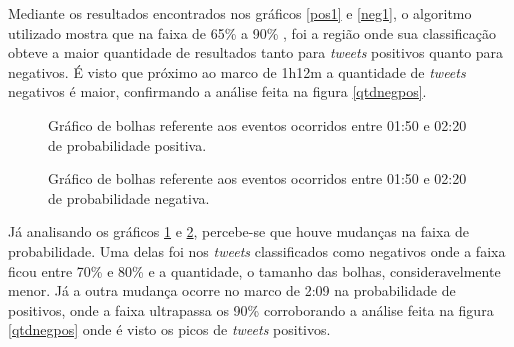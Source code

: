Mediante os resultados encontrados nos gráficos \ref{pos1} e \ref{neg1}, o algoritmo utilizado mostra que na faixa de 65\% a 90\% , foi a região onde sua classificação obteve a maior quantidade de resultados tanto para \textit{tweets} positivos quanto para negativos. É visto que próximo ao marco de 1h12m a quantidade de \textit{tweets} negativos é maior, confirmando a análise feita na figura \ref{qtdnegpos}.


\begin{figure}[H]
	\centering{}
	\caption{Gráfico de bolhas referente aos eventos ocorridos entre 01:50 e 02:20 de probabilidade positiva.}
	\label{pos2}
\end{figure}

\begin{figure}[H]
	\centering{}
	\caption{Gráfico de bolhas referente aos eventos ocorridos entre 01:50 e 02:20 de probabilidade negativa.}
	\label{neg2}
\end{figure}

Já analisando os gráficos \ref{pos2} e \ref{neg2}, percebe-se que houve mudanças na faixa de probabilidade. Uma delas foi nos \textit{tweets} classificados como negativos onde a faixa ficou entre 70\% e 80\%  e a quantidade, o tamanho das bolhas, consideravelmente menor. Já a outra mudança ocorre no marco de 2:09 na probabilidade de positivos, onde a faixa ultrapassa os 90\% corroborando a análise feita na figura \ref{qtdnegpos} onde é visto os picos de \textit{tweets} positivos.